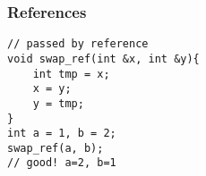 
\begin{frame}
\end{frame}

\begin{frame}[fragile]
\frametitle{References}
\begin{lstlisting}
// passed by reference
void swap_ref(int &x, int &y){
    int tmp = x;
    x = y;
    y = tmp;
}
int a = 1, b = 2;
swap_ref(a, b);
// good! a=2, b=1
\end{lstlisting}
\end{frame}